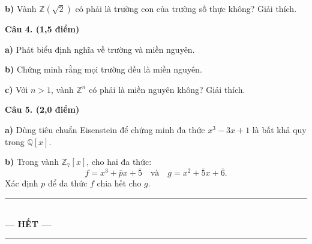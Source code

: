 \vspace{0.3cm}

\textbf{b)} Vành $\mathbb{Z}(\sqrt{2})$ có phải là trường con của trường số thực không? Giải thích.

\vspace{0.6cm}
\noindent\textbf{\large Câu 4. (1,5 điểm)}

\vspace{0.3cm}

\textbf{a)} Phát biểu định nghĩa về trường và miền nguyên.

\vspace{0.3cm}

\textbf{b)} Chứng minh rằng mọi trường đều là miền nguyên.

\vspace{0.3cm}

\textbf{c)} Với $n > 1$, vành $\mathbb{Z}^n$ có phải là miền nguyên không? Giải thích.

\vspace{0.6cm}
\noindent\textbf{\large Câu 5. (2,0 điểm)}

\vspace{0.3cm}

\textbf{a)} Dùng tiêu chuẩn Eisenstein để chứng minh đa thức $x^3 - 3x + 1$ là bất khả quy trong $\mathbb{Q}[x]$.

\vspace{0.3cm}

\textbf{b)} Trong vành $\mathbb{Z}_7[x]$, cho hai đa thức:
\[
    f = x^3 + \overline{p}x + \overline{5} \quad \text{và} \quad 
    g = x^2 + \overline{5}x + \overline{6}.
\]
Xác định $p$ để đa thức $f$ chia hết cho $g$.

\vspace{1.5cm}
\begin{center}
    \rule{0.5\textwidth}{0.5pt}\\[0.3cm]
    \textbf{\large --- HẾT ---}\\[0.3cm]
    \rule{0.5\textwidth}{0.5pt}
\end{center}

\newpage